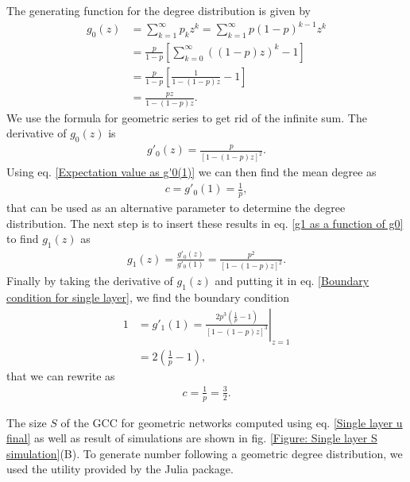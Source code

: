 \documentclass[
11pt, %
english, %
singlespacing, %
nolistspacing, %
liststotoc, %
headsepline, %
]{MastersDoctoralThesis} %
\begin{document}
The generating function for the degree distribution is given by
\begin{align}
	g_0(z) &= \sum_{k = 1}^\infty p_k z^k = \sum_{k=1}^\infty p (1-p)^{k-1} z^k \\
		&= \frac{p}{1 - p} \left[ \sum_{k = 0}^\infty \left((1-p) z\right)^k - 1\right] \\
		&= \frac{p}{1 - p} \left[\frac{1}{1 - (1 - p)z} - 1 \right]\\
		&= \frac{p z}{1 - (1 - p)z}. \label{g0 for exponential}
\end{align}
We use the formula for geometric series to get rid of the infinite sum. The derivative of $g_0(z)$ is
\begin{align}
	g'_0(z) = \frac{p}{\left[1 - (1 - p)z\right]^2}.
\end{align}
Using eq. \eqref{Expectation value as g'0(1)} we can then find the mean degree as
\begin{align}
	c = g'_0(1) = \frac{1}{p},
\end{align}
that can be used as an alternative parameter to determine the degree distribution. The next step is to insert these results in eq. \eqref{g1 as a function of g0} to find $g_1(z)$ as
\begin{align}
	g_1(z) = \frac{g'_0(z)}{g'_0(1)} = \frac{p^2}{\left[1 - (1 - p)z\right]^2}. \label{g1 for exponential}
\end{align}
Finally by taking the derivative of $g_1(z)$ and putting it in eq. \eqref{Boundary condition for single layer}, we find the boundary condition
\begin{align}
	1 &= g'_1(1) = \left. \frac{2 p^3 \left(\frac{1}{p} - 1\right)}{\left[1 - (1 - p)z\right]^3}\right\rvert_{z = 1} \\
		&= 2 \left(\frac{1}{p} - 1\right),
\end{align}
that we can rewrite as
\begin{align}
	c = \frac{1}{p} = \frac{3}{2}.
\end{align}

The size $S$ of the GCC for geometric networks computed using eq. \eqref{Single layer u final} as well as result of simulations are shown in fig. \ref{Figure: Single layer S simulation}(B). To generate number following a geometric degree distribution, we used the utility provided by the  Julia package.
\end{document}
